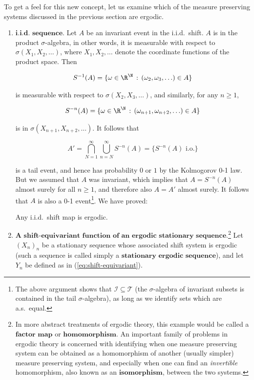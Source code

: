 \noindent To get a feel for this new concept, let us examine
which of the measure preserving systems discussed in
the previous section are ergodic.

\begin{enumerate}[label=\arabic*.]
\item $\textbf{i.i.d. sequence.}$ Let $A$ be an invariant
event in the i.i.d.\ shift. $A$ is in the product
$\sigma$-algebra, in other words, it is measurable
with respect to $\sigma(X_1,X_2,\ldots)$, where
$X_1,X_2,\ldots$ denote the coordinate functions of
the product space. Then

\[
S^{-1}(A) = \{ \omega\in \R^\N \, : \, (\omega_2,\omega_3,\ldots) \in A \}
\]

\noindent is measurable with respect to
$\sigma(X_2,X_3,\ldots)$, and similarly, for any
$n\ge 1$,

\[
S^{-n}(A) = \{ \omega\in \R^\N \, : \, (\omega_{n+1},\omega_{n+2},\ldots) \in A \}
\]

\noindent is in $\sigma(X_{n+1},X_{n+2},\ldots)$. It follows
that

\[
A'=\bigcap_{N=1}^\infty \bigcup_{n=N}^\infty S^{-n}(A) = \{ S^{-n}(A) \textrm{ i.o.} \}
\]

\noindent is a tail event, and hence has probability $0$ or $1$
by the Kolmogorov 0-1 law. But we assumed that $A$
was invariant, which implies that $A=S^{-n}(A)$
almost surely for all $n\ge 1$, and therefore also
$A=A'$ almost surely. It follows that $A$ is also a
0-1 event\footnote{The above argument shows that
$\mathcal{I}\subseteq\mathcal{T}$ (the
$\sigma$-algebra of invariant subsets is contained in
the tail $\sigma$-algebra), as long as we identify
sets which are a.s.\ equal.}. We have proved:

\begin{lem}
\label{lem-iid-ergodic}
Any i.i.d.\ shift map is ergodic.
\end{lem}

\item $\textbf{A shift-equivariant function of an ergodic
stationary sequence.}$\footnote{In more abstract treatments of ergodic theory, this
example would be called a $\textbf{factor map}$ or
$\textbf{homomorphism}$. An important family of
problems in ergodic theory is concerned with
identifying when one measure preserving system can be
obtained as a homomorphism of another (usually
simpler) measure preserving system, and especially
when one can find an \emph{invertible} homomorphism, also
known as an $\textbf{isomorphism}$, between the two
systems.}
Let $(X_n)_n$ be a stationary sequence whose
associated shift system is ergodic (such a sequence is
called simply a
$\textbf{stationary ergodic sequence}$), and let $Y_n$
be defined as in (\ref{eq:shift-equivariant}).


\end{enumerate}
